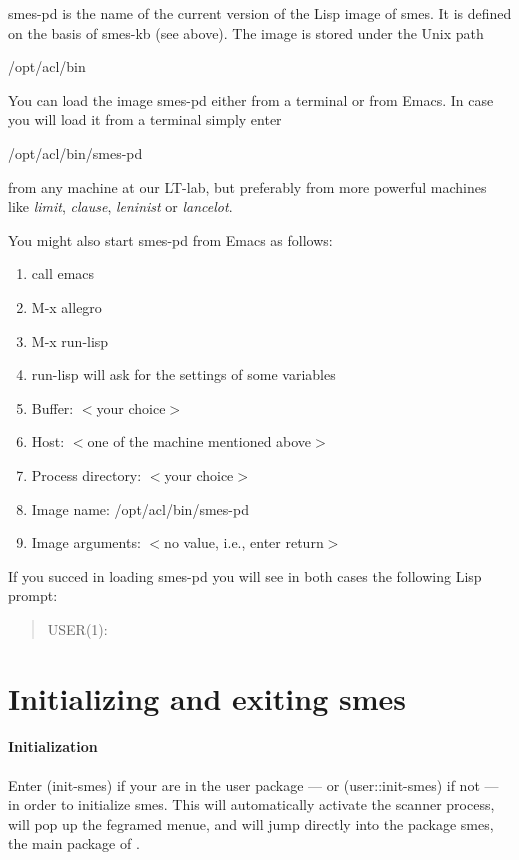 {\sc smes-pd} is the name of the current version of the Lisp image of
{\sc smes}. It is defined on the basis of {\sc smes-kb} (see above).
The image is stored under the Unix path
\begin{center}
/opt/acl/bin
\end{center}

You can load the image {\sc smes-pd} either from a terminal or from Emacs.
In case you will load it from a terminal simply enter
\begin{center}
/opt/acl/bin/smes-pd
\end{center}
 
from any machine at our LT-lab, but preferably from more powerful
machines like {\em limit}, {\em clause}, {\em leninist} or {\em lancelot}.

You might also start {\sc smes-pd} from Emacs as follows:
\begin{enumerate}
\item call emacs
\item M-x allegro
\item M-x run-lisp
\item run-lisp will ask for the settings of some variables
\item Buffer: $<$your choice$>$
\item Host: $<$one of the machine mentioned above$>$
\item Process directory: $<$your choice$>$
\item Image name: /opt/acl/bin/smes-pd
\item Image arguments: $<$no value, i.e., enter return$>$
\end{enumerate}

If you succed in loading {\sc smes-pd} you will see in both cases the
following Lisp prompt:
\begin{verse}
USER(1):
\end{verse}

\section{Initializing and exiting {\sc smes}}

\paragraph{Initialization}
Enter {\sc (init-smes)} if your are in the {\sc user} package
--- or {\sc (user::init-smes)} if not ---
in order to initialize {\sc smes}. This will
automatically activate the {\sc scanner} process, will pop up the
{\sc fegramed} menue, and will jump directly into the package {\sc
smes}, the main package of \smes .


